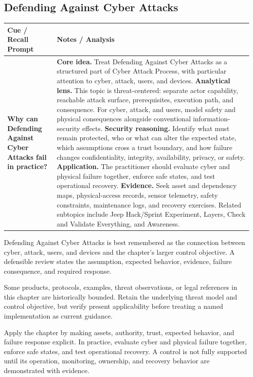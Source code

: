 \documentclass[11pt]{article}
\newcommand{\CornellHeader}{%
\rowcolor{Navy}\color{white}\bfseries Cue / Recall Prompt & \color{white}\bfseries Notes / Analysis\\\hline}
\newcommand{\CornellRow}[2]{%
\cellcolor{CueGray}\RaggedRight\textbf{#1} & \RaggedRight #2\\\hline}
\begin{document}
\subsection*{Defending Against Cyber Attacks}
\begin{longtable}{>{\RaggedRight\arraybackslash}p{}|>{\RaggedRight\arraybackslash}p{}}
\CornellHeader
\CornellRow{Why can Defending Against Cyber Attacks fail in practice?}{\textbf{Core idea.} Treat Defending Against Cyber Attacks as a structured part of Cyber Attack Process, with particular attention to cyber, attack, users, and devices. \textbf{Analytical lens.} This topic is threat-centered: separate actor capability, reachable attack surface, prerequisites, execution path, and consequence. For cyber, attack, and users, model safety and physical consequences alongside conventional information-security effects. \textbf{Security reasoning.} Identify what must remain protected, who or what can alter the expected state, which assumptions cross a trust boundary, and how failure changes confidentiality, integrity, availability, privacy, or safety. \textbf{Application.} The practitioner should evaluate cyber and physical failure together, enforce safe states, and test operational recovery. \textbf{Evidence.} Seek asset and dependency maps, physical-access records, sensor telemetry, safety constraints, maintenance logs, and recovery exercises. Related subtopics include Jeep Hack/Sprint Experiment, Layers, Check and Validate Everything, and Awareness.}
\end{longtable}
\begin{topicsummary}
Defending Against Cyber Attacks is best remembered as the connection between cyber, attack, users, and devices and the chapter's larger control objective. A defensible review states the assumption, expected behavior, evidence, failure consequence, and required response.
\end{topicsummary}
\begin{historybox}
Some products, protocols, examples, threat observations, or legal references in this chapter are historically bounded. Retain the underlying threat model and control objective, but verify present applicability before treating a named implementation as current guidance.
\end{historybox}
\begin{defensebox}
Apply the chapter by making assets, authority, trust, expected behavior, and failure response explicit. In practice, evaluate cyber and physical failure together, enforce safe states, and test operational recovery. A control is not fully supported until its operation, monitoring, ownership, and recovery behavior are demonstrated with evidence.
\end{defensebox}
\end{document}
